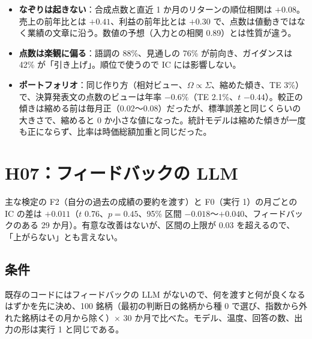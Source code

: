 \documentclass[xelatex,ja=standard,jafont=haranoaji,a4paper,10pt,openany]{bxjsreport}
\begin{document}
\begin{itemize}
\item \textbf{なぞりは起きない}：合成点数と直近 1 か月のリターンの順位相関は $+0.08$。売上の前年比とは $+0.41$、利益の前年比とは $+0.30$ で、点数は値動きではなく業績の文章に沿う。数値の予想（入力との相関 0.89）とは性質が違う。
\item \textbf{点数は楽観に偏る}：語調の 88\%、見通しの 76\% が前向き、ガイダンスは 42\% が「引き上げ」。順位で使うので IC には影響しない。
\item \textbf{ポートフォリオ}：同じ作り方（相対ビュー、$\Omega\propto\Sigma$、縮めた傾き、TE 3\%）で、決算発表文の点数のビューは年率 $-0.6\%$（TE 2.1\%、$t$ $-0.44$）。較正の傾きは縮める前は毎月正（0.02〜0.08）だったが、標準誤差と同じくらいの大きさで、縮めると 0 か小さな値になった。統計モデルは縮めた傾きが一度も正にならず、比率は時価総額加重と同じだった。
\end{itemize}

\chapter{H07：フィードバックの LLM}\label{ch:h07}

\begin{verdict}[判定：結論を出すには証拠が不足している]
主な検定の F2（自分の過去の成績の要約を渡す）と F0（実行 1）の月ごとの IC の差は $+0.011$（$t$ 0.76、$p=0.45$、95\% 区間 $-0.018$〜$+0.040$、フィードバックのある 29 か月）。有意な改善はないが、区間の上限が 0.03 を超えるので、「上がらない」とも言えない。
\end{verdict}

\section{条件}

既存のコードにはフィードバックの LLM がないので、何を渡すと何が良くなるはずかを先に決め、100 銘柄（最初の判断日の銘柄から種 0 で選び、指数から外れた銘柄はその月から除く）$\times$ 30 か月で比べた。モデル、温度、回答の数、出力の形は実行 1 と同じである。
\end{document}
